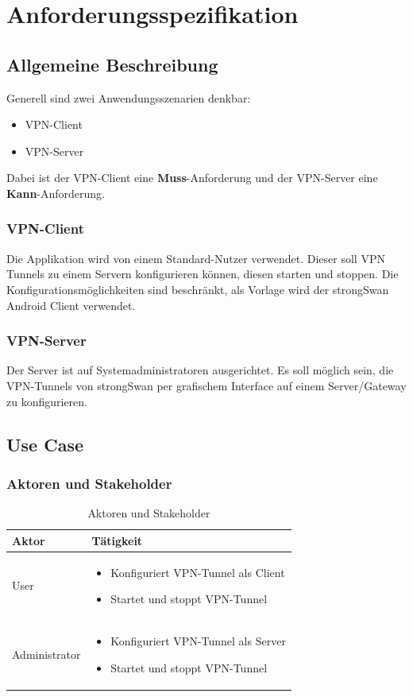 \section{Anforderungsspezifikation}
\subsection{Allgemeine Beschreibung}
Generell sind zwei Anwendungsszenarien denkbar:
\begin{itemize}
	\item VPN-Client
	\item VPN-Server
\end{itemize}
\medskip
Dabei ist der VPN-Client eine \textbf{Muss}-Anforderung und der VPN-Server eine \textbf{Kann}-Anforderung.
\medskip
\subsubsection{VPN-Client}
Die Applikation wird von einem Standard-Nutzer verwendet. Dieser soll VPN Tunnels zu einem Servern konfigurieren können, diesen starten und stoppen. Die Konfigurationsmöglichkeiten sind beschränkt, als Vorlage wird der strongSwan Android Client verwendet.\\


\subsubsection{VPN-Server}
Der Server ist auf Systemadministratoren ausgerichtet. Es soll möglich sein, die VPN-Tunnels von strongSwan per grafischem Interface auf einem Server/Gateway zu konfigurieren.

\subsection{Use Case}
\subsubsection{Aktoren und Stakeholder}
\begin{table}[H]
\centering
    \begin{tabular}{|p{3cm}|p{9cm}|}
    \hline
    \rowcolor{lightblue}
    Aktor & Tätigkeit   \\ \hline
	User  & 
			\begin{itemize}
			\item Konfiguriert VPN-Tunnel als Client
    		\item Startet und stoppt VPN-Tunnel
		\end{itemize}	
	\\ \hline
	Administrator & 
			\begin{itemize}
			\item Konfiguriert VPN-Tunnel als Server
    		\item Startet und stoppt VPN-Tunnel
		\end{itemize}	
	\\ \hline
	\end{tabular}
    \caption[Aktoren und Stakeholder]{Aktoren und Stakeholder}
\end{table}




